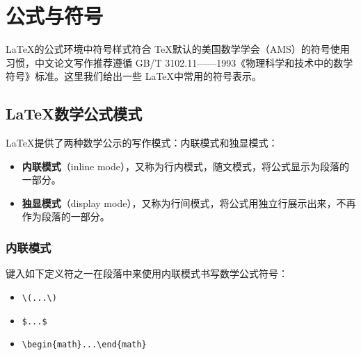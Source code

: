 %
%
%
%
%

\chapter{公式与符号}

\LaTeX 的公式环境中符号样式符合 \TeX 默认的美国数学学会（AMS）的符号使用习惯，中文论文写作推荐遵循 GB/T 3102.11——1993《物理科学和技术中的数学符号》标准。这里我们给出一些 \LaTeX 中常用的符号表示。


\section{\LaTeX 数学公式模式}

\LaTeX 提供了两种数学公示的写作模式：内联模式和独显模式：

\begin{itemize}
    \item \textbf{内联模式}（inline mode），又称为行内模式，随文模式，将公式显示为段落的一部分。
    \item \textbf{独显模式}（display mode），又称为行间模式，将公式用独立行展示出来，不再作为段落的一部分。
\end{itemize}

\subsection{内联模式}


键入如下定义符之一在段落中来使用内联模式书写数学公式符号：

\begin{itemize}
    \item \verb|\(...\)|
    \item \verb|$...$|
    \item \verb|\begin{math}...\end{math}|
\end{itemize}

